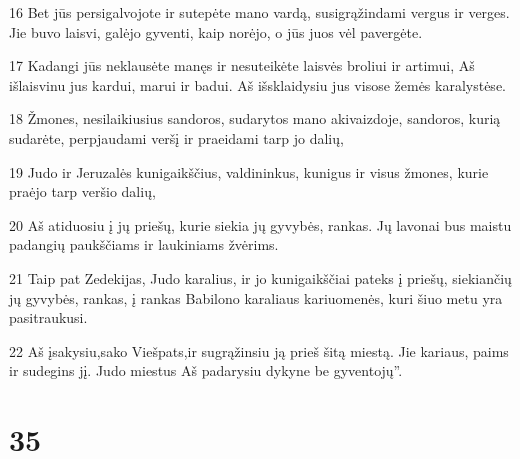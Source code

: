 \par 16 Bet jūs persigalvojote ir sutepėte mano vardą, susigrąžindami vergus ir verges. Jie buvo laisvi, galėjo gyventi, kaip norėjo, o jūs juos vėl pavergėte. 
\par 17 Kadangi jūs neklausėte manęs ir nesuteikėte laisvės broliui ir artimui, Aš išlaisvinu jus kardui, marui ir badui. Aš išsklaidysiu jus visose žemės karalystėse. 
\par 18 Žmones, nesilaikiusius sandoros, sudarytos mano akivaizdoje, sandoros, kurią sudarėte, perpjaudami veršį ir praeidami tarp jo dalių, 
\par 19 Judo ir Jeruzalės kunigaikščius, valdininkus, kunigus ir visus žmones, kurie praėjo tarp veršio dalių, 
\par 20 Aš atiduosiu į jų priešų, kurie siekia jų gyvybės, rankas. Jų lavonai bus maistu padangių paukščiams ir laukiniams žvėrims. 
\par 21 Taip pat Zedekijas, Judo karalius, ir jo kunigaikščiai pateks į priešų, siekiančių jų gyvybės, rankas, į rankas Babilono karaliaus kariuomenės, kuri šiuo metu yra pasitraukusi. 
\par 22 Aš įsakysiu,­sako Viešpats,­ir sugrąžinsiu ją prieš šitą miestą. Jie kariaus, paims ir sudegins jį. Judo miestus Aš padarysiu dykyne be gyventojų”.



\chapter{35}


